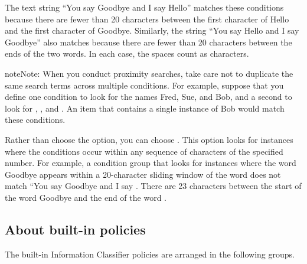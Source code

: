 \documentclass[letterpaper,10pt,english]{sphinxmanual}
\begin{document}
The text string “You say Goodbye and I say Hello” matches these conditions because there are fewer than 20 characters between the first character of Hello and the first character of Goodbye. Similarly, the string “You say Hello and I say Goodbye” also matches because there are fewer than 20 characters between the ends of the two words. In each case, the spaces count as characters.

\begin{sphinxadmonition}{note}{Note:}
When you conduct  proximity searches, take care not to duplicate the same search terms across multiple conditions. For example, suppose that you define one condition to look for the names Fred, Sue, and Bob, and a second to look for , , and . An item that contains a single instance of Bob would match these conditions.
\end{sphinxadmonition}

Rather than choose the  option, you can choose . This option looks for instances where the conditions occur within any sequence of characters of the specified number. For example, a condition group that looks for instances where the word Goodbye appears within a 20-character sliding window of the word  does not match “You say Goodbye and I say . There are 23 characters between the start of the word Goodbye and the end of the word .

\begin{figure}[htbp]
\centering

\noindent{}
\end{figure}


\subsection{About built-in policies}
\label{\detokenize{mcdmp_app_ug:about-built-in-policies}}
The built-in Information Classifier policies are arranged in the following groups.

\end{document}

